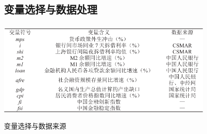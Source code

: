 \documentclass[12pt,aspectratio=169]{ctexbeamer}
\begin{document}
			\subsection{变量选择与数据处理}
			\begin{frame}
				\frametitle{}
				\begin{table}
					\centering
					\includegraphics[width=0.8\textwidth]{figures/tab.4-1}
					\caption{变量选择与数据来源}
					\label{data}
				\end{table}
			\end{frame}
\end{document}
